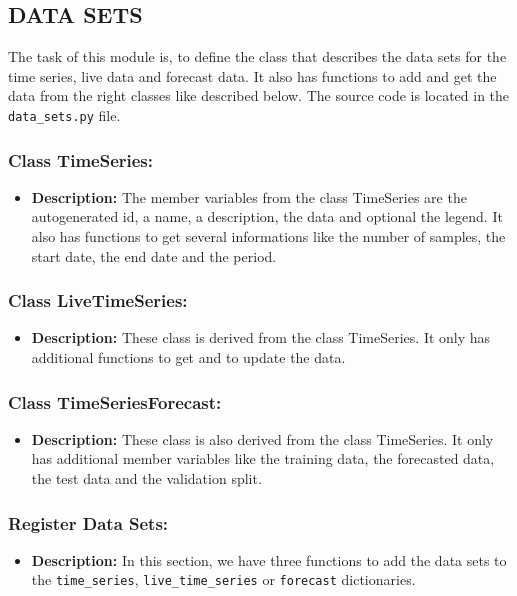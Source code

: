 \documentclass[11pt, a4paper]{article}
\begin{document}
\subsection{DATA SETS}
The task of this module is, to define the class that describes the data sets for the time series, live data and forecast data.
It also has functions to add and get the data from the right classes like described below.
The source code is located in the \texttt{data\_sets.py} file.


\subsubsection*{Class TimeSeries:}
\begin{itemize}
 \item[] \textbf{Description:} The member variables from the class TimeSeries are the autogenerated id, a name, a description, the data and optional the legend. 
 It also has functions to get several informations like the number of samples, the start date, the end date and the period.
\end{itemize}


\subsubsection*{Class LiveTimeSeries:}
\begin{itemize}
 \item[] \textbf{Description:} These class is derived from the class TimeSeries. It only has additional functions to get and to update the data.
\end{itemize}


\subsubsection*{Class TimeSeriesForecast:}
\begin{itemize}
 \item[] \textbf{Description:} These class is also derived from the class TimeSeries. It only has additional member variables like 
 the training data, the forecasted data, the test data and the validation split.
\end{itemize}


\subsubsection*{Register Data Sets:}
\begin{itemize}
 \item[] \textbf{Description:} In this section, we have three functions to add the data sets to the \texttt{time\_series}, \texttt{live\_time\_series} or \texttt{forecast} dictionaries.
\end{itemize}
\end{document}
